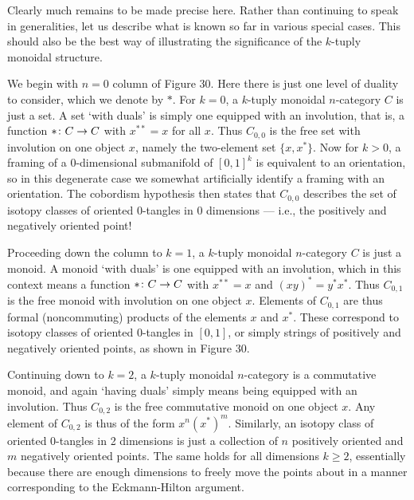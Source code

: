 Clearly much remains to be made precise here. Rather than
continuing to speak in generalities, let us describe what is
known so far in various special cases.   This should also be the
best way of illustrating the significance of the $k$-tuply monoidal
structure.



We begin with $n = 0$ column of Figure 30.  Here there is just
one level of duality to consider, which we denote by $\ast$.  For $k
= 0$, a $k$-tuply monoidal $n$-category $C$ is just a set.  A set
`with duals' is simply one equipped with an involution, that is,
a function $\ast \colon C \to C$ with $x^{\ast\ast} = x$ for all
$x$.  Thus $C_{0,0}$ is the free set with involution on one
object $x$, namely the two-element set $\{x,x^\ast\}$.    Now for
$k > 0$, a framing of a 0-dimensional submanifold of $[0,1]^k$ is
equivalent to an orientation, so in this degenerate case we
somewhat artificially identify a framing with an orientation.
The cobordism hypothesis then states that $C_{0,0}$ describes the
set of isotopy classes of oriented 0-tangles in 0 dimensions ---
i.e., the positively and negatively oriented point!

Proceeding down the column to $k = 1$, a $k$-tuply monoidal
$n$-category $C$ is just a monoid.  A monoid `with duals' is one
equipped with an involution, which in this context means a
function $\ast \colon C \to C$ with $x^{\ast\ast} = x$ and $(xy)^\ast =
y^\ast x^\ast$.   Thus $C_{0,1}$ is the free monoid with
involution on one object $x$.  Elements of $C_{0,1}$ are thus
formal (noncommuting) products  of the elements $x$ and $x^\ast$.
These correspond to isotopy classes of oriented
$0$-tangles in $[0,1]$, or simply strings of positively and
negatively oriented points, as shown in Figure 30.

Continuing down to $k = 2$, a $k$-tuply monoidal $n$-category is
a commutative monoid, and again `having duals' simply means being
equipped with an involution.   Thus $C_{0,2}$ is the free
commutative monoid on one object $x$.  Any element of $C_{0,2}$
is thus of the form $x^n (x^\ast)^m$.   Similarly, an isotopy
class of oriented $0$-tangles in 2 dimensions is just a
collection of $n$ positively oriented and $m$ negatively oriented
points.  The same holds for all dimensions $k \ge 2$, essentially
because there are enough dimensions to freely move the points
about in a manner corresponding to the Eckmann-Hilton argument.

